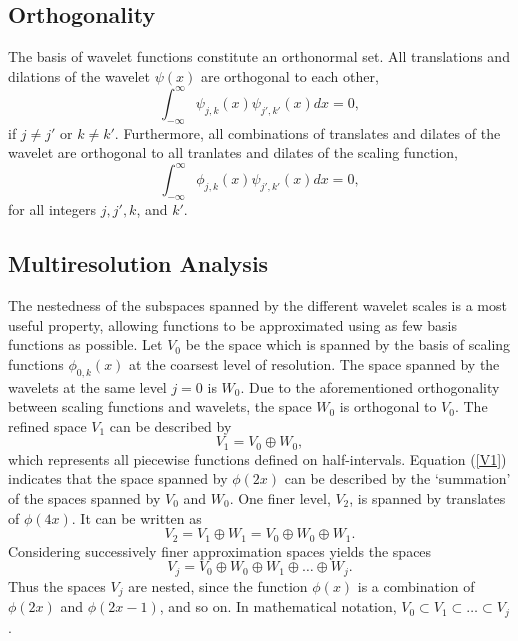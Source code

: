 \documentclass[10.5pt]{article}
\begin{document}
\subsection*{Orthogonality}
The basis of wavelet functions constitute an orthonormal set. All translations and dilations of the 
wavelet $\psi(x)$ are orthogonal to each other,
\begin{equation}
\int_{-\infty}^{\infty} \psi_{j,k}(x) \psi_{j',k'}(x) dx = 0,
\end{equation}
if $j \neq j'$ or $k \neq k'$. Furthermore, all combinations of translates and dilates of the wavelet are orthogonal
to all tranlates and dilates of the scaling function,
\begin{equation}
\int_{-\infty}^{\infty} \phi_{j,k}(x) \psi_{j',k'}(x) dx = 0,
\end{equation}
for all integers $j,j',k$, and $k'$.

\subsection*{Multiresolution Analysis}
The nestedness of the subspaces spanned by the different wavelet scales is a most useful property, allowing functions
to be approximated using as few basis functions as possible. Let $V_0$ be the space which is spanned by the basis of 
scaling functions $\phi_{0,k}(x)$ at the coarsest level of resolution. The space spanned by the wavelets at the same
level $j=0$ is $W_0$. Due to the aforementioned orthogonality between scaling functions and wavelets, the space
$W_0$ is orthogonal to $V_0$. The refined space $V_1$ can be described by
\begin{equation}
V_1 = V_0 \oplus W_0,
\label{V1}
\end{equation}
which represents all piecewise functions defined on half-intervals. Equation (\ref{V1}) indicates that the space spanned by 
$\phi(2x)$ can be described by the `summation' of the spaces spanned by
$V_0$ and $W_0$. One finer level, $V_2$, is spanned by translates of $\phi(4x)$. It can be written as
\begin{equation}
V_2 = V_1 \oplus W_1 = V_0 \oplus W_0 \oplus W_1.
\label{V2}
\end{equation}
Considering successively finer approximation spaces yields the spaces
\begin{equation}
V_j = V_0 \oplus W_0 \oplus W_1 \oplus \dots \oplus W_j.
\end{equation}
Thus the spaces $V_j$ are nested, since the function $\phi(x)$ is a combination of $\phi(2x)$ and $\phi(2x-1)$, and so on. 
In mathematical notation, $V_0 \subset V_1 \subset \dots \subset V_j$.
\end{document}

